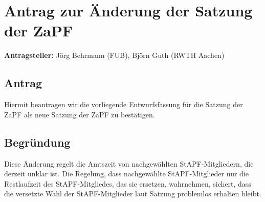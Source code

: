\documentclass[a4,12pt,oneside]{scrartcl}
\begin{document}
\section*{Antrag zur Änderung der Satzung der ZaPF}

\textbf{Antragsteller:} Jörg Behrmann (FUB), Björn Guth (RWTH Aachen)

\subsection*{Antrag}

Hiermit beantragen wir die vorliegende Entwurfsfassung für die Satzung der ZaPF als neue Satzung der ZaPF zu bestätigen.

\subsection*{Begründung}

Diese Änderung regelt die Amtszeit von nachgewählten StAPF-Mitgliedern, die
derzeit unklar ist.
Die Regelung, dass nachgewählte StAPF-Mitglieder nur die Restlaufzeit des
StAPF-Mitgliedes, das sie ersetzen, wahrnehmen, sichert, dass die versetzte Wahl
der StAPF-Mitglieder laut Satzung problemlos erhalten bleibt.
\end{document}
